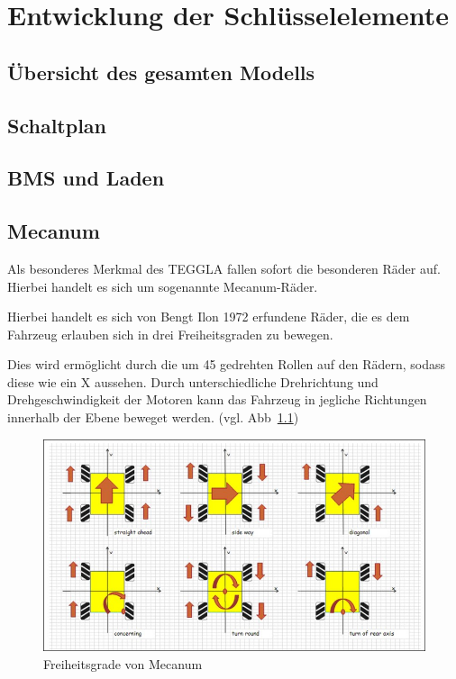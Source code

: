 \chapter{Entwicklung der Schlüsselelemente}
\section{Übersicht des gesamten Modells}

\section{Schaltplan}

\section{BMS und Laden}

\section{Mecanum}
Als besonderes Merkmal des TEGGLA fallen sofort die besonderen Räder auf. Hierbei handelt es sich um sogenannte Mecanum-Räder. 

Hierbei handelt es sich von Bengt Ilon 1972 erfundene Räder, die es dem Fahrzeug erlauben sich in drei Freiheitsgraden zu bewegen.

Dies wird ermöglicht durch die um 45\degree{} gedrehten Rollen auf den Rädern, sodass diese wie ein X aussehen.
Durch unterschiedliche Drehrichtung und Drehgeschwindigkeit der Motoren kann das Fahrzeug in jegliche Richtungen innerhalb der Ebene beweget werden. (vgl. Abb~\ref{bild:mecanum})

\begin{figure}[!ht]
	\centering
	\includegraphics[width=\textwidth]{bilder/mecanum.jpg}
	\caption{Freiheitsgrade von Mecanum \cite{link:mecanum}}
	\label{bild:mecanum}
\end{figure}

